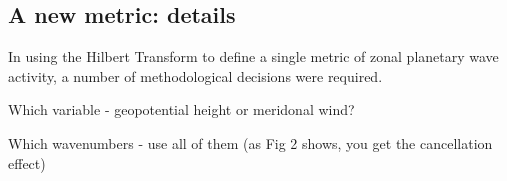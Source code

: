 \subsection{A new metric: details}

In using the Hilbert Transform to define a single metric of zonal planetary wave activity, a number of methodological decisions were required. 

Which variable - geopotential height or meridonal wind?

Which wavenumbers - use all of them (as Fig 2 shows, you get the cancellation effect)